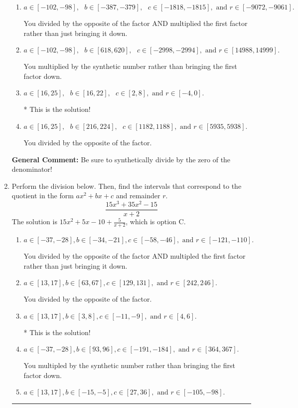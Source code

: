 \documentclass{extbook}[14pt]
\newcommand{\litem}[1]{\item #1

\rule{\textwidth}{0.4pt}}
\begin{document}
\begin{enumerate}
{\begin{enumerate}[label=\Alph*.]
 You multiplied by the synthetic number and subtracted rather than adding during synthetic division.
\item \( a \in [-102, -98], \text{   } b \in [-387, -379], \text{   } c \in [-1818, -1815], \text{   and   } r \in [-9072, -9061]. \)

 You divided by the opposite of the factor AND multiplied the first factor rather than just bringing it down.
\item \( a \in [-102, -98], \text{   } b \in [618, 620], \text{   } c \in [-2998, -2994], \text{   and   } r \in [14988, 14999]. \)

 You multiplied by the synthetic number rather than bringing the first factor down.
\item \( a \in [16, 25], \text{   } b \in [16, 22], \text{   } c \in [2, 8], \text{   and   } r \in [-4, 0]. \)

* This is the solution!
\item \( a \in [16, 25], \text{   } b \in [216, 224], \text{   } c \in [1182, 1188], \text{   and   } r \in [5935, 5938]. \)

 You divided by the opposite of the factor.
\end{enumerate}

\textbf{General Comment:} Be sure to synthetically divide by the zero of the denominator!
}
\litem{
Perform the division below. Then, find the intervals that correspond to the quotient in the form $ax^2+bx+c$ and remainder $r$.
\[ \frac{15x^{3} +35 x^{2} -15}{x + 2} \]The solution is \( 15x^{2} +5 x -10 + \frac{5}{x + 2} \), which is option C.\begin{enumerate}[label=\Alph*.]
\item \( a \in [-37, -28], b \in [-34, -21], c \in [-58, -46], \text{ and } r \in [-121, -110]. \)

 You divided by the opposite of the factor AND multipled the first factor rather than just bringing it down.
\item \( a \in [13, 17], b \in [63, 67], c \in [129, 131], \text{ and } r \in [242, 246]. \)

 You divided by the opposite of the factor.
\item \( a \in [13, 17], b \in [3, 8], c \in [-11, -9], \text{ and } r \in [4, 6]. \)

* This is the solution!
\item \( a \in [-37, -28], b \in [93, 96], c \in [-191, -184], \text{ and } r \in [364, 367]. \)

 You multipled by the synthetic number rather than bringing the first factor down.
\item \( a \in [13, 17], b \in [-15, -5], c \in [27, 36], \text{ and } r \in [-105, -98]. \)


\end{enumerate}}
\end{enumerate}
\end{document}
